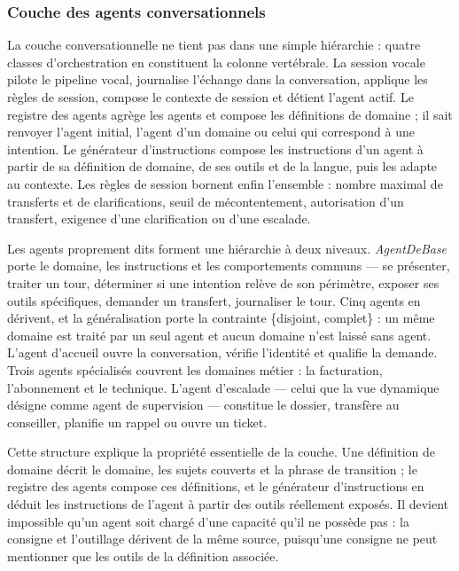 \subsubsection{Couche des agents conversationnels}

La couche conversationnelle ne tient pas dans une simple hiérarchie : quatre classes d'orchestration en constituent la colonne vertébrale. La session vocale pilote le pipeline vocal, journalise l'échange dans la conversation, applique les règles de session, compose le contexte de session et détient l'agent actif. Le registre des agents agrège les agents et compose les définitions de domaine ; il sait renvoyer l'agent initial, l'agent d'un domaine ou celui qui correspond à une intention. Le générateur d'instructions compose les instructions d'un agent à partir de sa définition de domaine, de ses outils et de la langue, puis les adapte au contexte. Les règles de session bornent enfin l'ensemble : nombre maximal de transferts et de clarifications, seuil de mécontentement, autorisation d'un transfert, exigence d'une clarification ou d'une escalade.

Les agents proprement dits forment une hiérarchie à deux niveaux. \emph{AgentDeBase} porte le domaine, les instructions et les comportements communs — se présenter, traiter un tour, déterminer si une intention relève de son périmètre, exposer ses outils spécifiques, demander un transfert, journaliser le tour. Cinq agents en dérivent, et la généralisation porte la contrainte \{disjoint, complet\} : un même domaine est traité par un seul agent et aucun domaine n'est laissé sans agent. L'agent d'accueil ouvre la conversation, vérifie l'identité et qualifie la demande. Trois agents spécialisés couvrent les domaines métier : la facturation, l'abonnement et le technique. L'agent d'escalade — celui que la vue dynamique désigne comme agent de supervision — constitue le dossier, transfère au conseiller, planifie un rappel ou ouvre un ticket.

Cette structure explique la propriété essentielle de la couche. Une définition de domaine décrit le domaine, les sujets couverts et la phrase de transition ; le registre des agents compose ces définitions, et le générateur d'instructions en déduit les instructions de l'agent à partir des outils réellement exposés. Il devient impossible qu'un agent soit chargé d'une capacité qu'il ne possède pas : la consigne et l'outillage dérivent de la même source, puisqu'une consigne ne peut mentionner que les outils de la définition associée.

